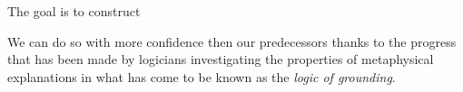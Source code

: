 \documentclass{article}
\theoremstyle{definition}
\theoremstyle{definition}
\theoremstyle{definition}
\theoremstyle{definition}
\theoremstyle{remark}
\theoremstyle{definition}
\theoremstyle{definition}
\begin{document}
The goal is to construct  

We can do so with more confidence then our predecessors thanks to the progress that has been made by logicians investigating the properties of metaphysical explanations in what has come to be known as the \textit{logic of grounding}.
 
 
\end{document}
